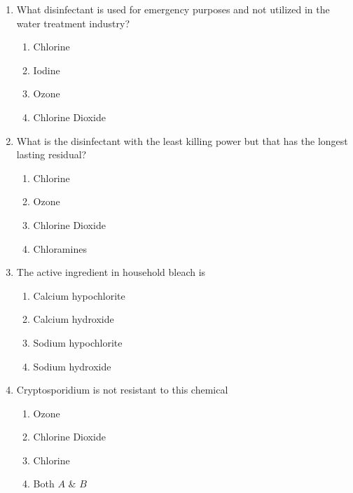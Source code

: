 \documentclass{article}
\begin{document}
\begin{enumerate}
\item  What disinfectant is used for emergency purposes and not utilized in the water treatment industry?\\
\begin{enumerate}
\item Chlorine\\
\item Iodine\\
\item Ozone\\
\item Chlorine Dioxide
\end{enumerate}

\item  What is the disinfectant with the least killing power but that has the longest lasting residual?\\
\begin{enumerate}
\item Chlorine\\
\item Ozone\\
\item Chlorine Dioxide\\
\item Chloramines
\end{enumerate}

\item  The active ingredient in household bleach is\\
\begin{enumerate}
\item Calcium hypochlorite\\
\item Calcium hydroxide\\
\item Sodium hypochlorite\\
\item Sodium hydroxide
\end{enumerate}

\item Cryptosporidium is not resistant to this chemical\\
\begin{enumerate}
\item Ozone\\
\item Chlorine Dioxide\\
\item Chlorine\\
\item Both $A$ \& $B$
\end{enumerate}


\end{enumerate}
\end{document}

